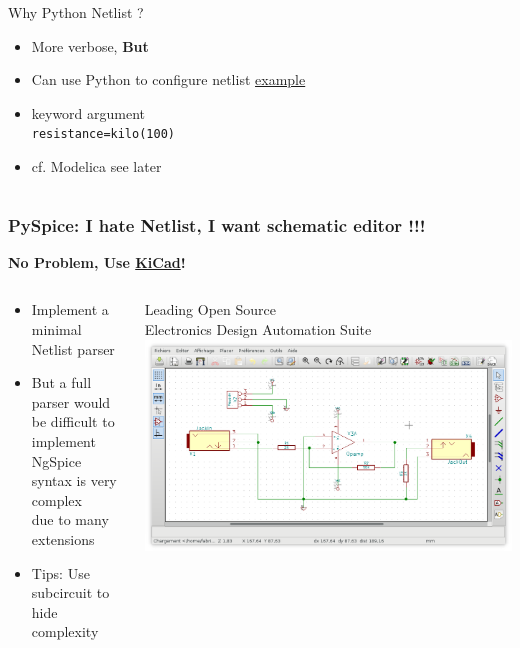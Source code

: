 \begin{frame}
\begin{columns}[T]
\begin{column}{.5\textwidth}
      Why Python Netlist ?
      \begin{itemize}
      \item More verbose, \textbf{But}
      \item Can use Python to configure netlist
        \href{https://pyspice.fabrice-salvaire.fr/examples/diode/voltage-multiplier.html}{example}
      \item keyword argument \\
        \texttt{resistance=kilo(100)}
      \item cf. Modelica \tiny{see later}
      \end{itemize}
    \end{column}
  \end{columns}
\end{frame}

\begin{frame}
  \frametitle{PySpice: I hate Netlist, I want schematic editor !!! }
  \centerline{\textbf{No Problem, Use \href{http://kicad-pcb.org}{KiCad}!}}
  \vspace{1em}
  \begin{columns}
    \begin{column}{.6\textwidth}
      \begin{itemize}
      \item Implement a minimal Netlist parser
      \item \alert{But a full parser would be difficult to implement} \\
        NgSpice syntax is very complex \\
        due to many extensions \\
      \item Tips: Use subcircuit to hide complexity
      \end{itemize}
    \end{column}
    \begin{column}{.4\textwidth}
      \begin{center}
        Leading Open Source \\
        Electronics Design Automation Suite \\[1em]
        \includegraphics[width=1.\textwidth]{images/kicad.png}

\end{center}
\end{column}
\end{columns}
\end{frame}
